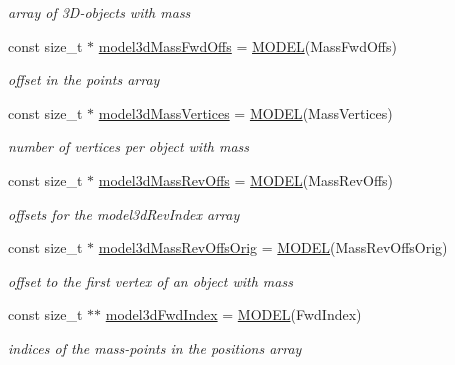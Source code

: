 \begin{DoxyCompactItemize}
\begin{DoxyCompactList}\small\item\em array of 3\+D-\/objects with mass \end{DoxyCompactList}\item 
const size\+\_\+t $\ast$ \hyperlink{namespacestd_a22dba9fb8da88b07cd8b471827b6fac7}{model3d\+Mass\+Fwd\+Offs} = \hyperlink{model__mapping_8cpp_a4d1624dd68db4a8494c5e998b5aa60f9}{M\+O\+D\+E\+L}(Mass\+Fwd\+Offs)
\begin{DoxyCompactList}\small\item\em offset in the points array \end{DoxyCompactList}\item 
const size\+\_\+t $\ast$ \hyperlink{namespacestd_aea2c80cb8809cdc4c2f3b2b0961d3036}{model3d\+Mass\+Vertices} = \hyperlink{model__mapping_8cpp_a4d1624dd68db4a8494c5e998b5aa60f9}{M\+O\+D\+E\+L}(Mass\+Vertices)
\begin{DoxyCompactList}\small\item\em number of vertices per object with mass \end{DoxyCompactList}\item 
const size\+\_\+t $\ast$ \hyperlink{namespacestd_acb567e43ad7c5a09fec7eeed5b529d96}{model3d\+Mass\+Rev\+Offs} = \hyperlink{model__mapping_8cpp_a4d1624dd68db4a8494c5e998b5aa60f9}{M\+O\+D\+E\+L}(Mass\+Rev\+Offs)
\begin{DoxyCompactList}\small\item\em offsets for the model3d\+Rev\+Index array \end{DoxyCompactList}\item 
const size\+\_\+t $\ast$ \hyperlink{namespacestd_ad0535524d79ce742b34e78404e55a224}{model3d\+Mass\+Rev\+Offs\+Orig} = \hyperlink{model__mapping_8cpp_a4d1624dd68db4a8494c5e998b5aa60f9}{M\+O\+D\+E\+L}(Mass\+Rev\+Offs\+Orig)
\begin{DoxyCompactList}\small\item\em offset to the first vertex of an object with mass \end{DoxyCompactList}\item 
const size\+\_\+t $\ast$$\ast$ \hyperlink{namespacestd_a339638085d29cb13db371a07634085c6}{model3d\+Fwd\+Index} = \hyperlink{model__mapping_8cpp_a4d1624dd68db4a8494c5e998b5aa60f9}{M\+O\+D\+E\+L}(Fwd\+Index)
\begin{DoxyCompactList}\small\item\em indices of the mass-\/points in the positions array \end{DoxyCompactList}\item 
$$
\end{DoxyCompactItemize}
